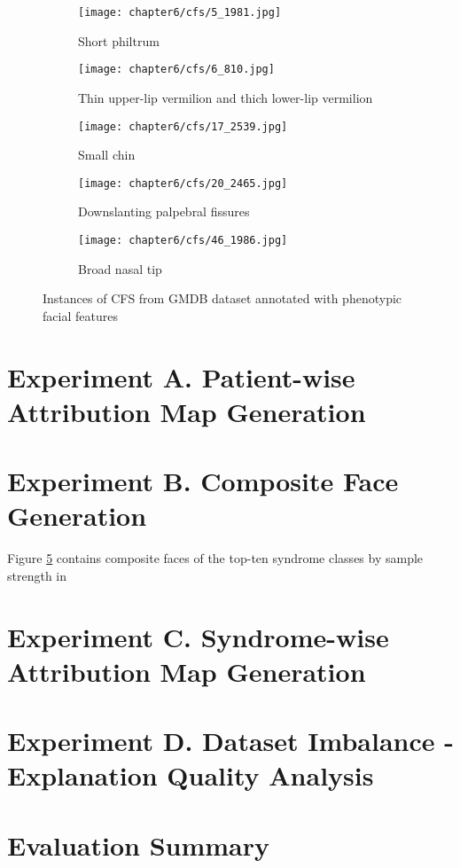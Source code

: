 \documentclass[../report.tex]{subfiles}
\begin{document}
	 \begin{figure}[H]\label{fig_cfs}
	 	\centering
	 	\begin{subfigure}[t]{0.17\textwidth}
	 		\centering
	 		\texttt{[image: chapter6/cfs/5\_1981.jpg]}
	 		\caption{Short philtrum}
	 	\end{subfigure}
	 	\begin{subfigure}[t]{0.17\textwidth}
	 		\centering
	 		\texttt{[image: chapter6/cfs/6\_810.jpg]}
	 		\caption{Thin upper-lip vermilion and thich lower-lip vermilion }
	 	\end{subfigure}	
	 	\begin{subfigure}[t]{0.17\textwidth}
	 		\centering
	 		\texttt{[image: chapter6/cfs/17\_2539.jpg]}
	 		\caption{Small chin}
	 	\end{subfigure}	
	 	\begin{subfigure}[t]{0.17\textwidth}
	 		\centering
	 		\texttt{[image: chapter6/cfs/20\_2465.jpg]}
	 		\caption{Downslanting palpebral fissures}
	 	\end{subfigure}	
	 	\begin{subfigure}[t]{0.17\textwidth}
	 		\centering
	 		\texttt{[image: chapter6/cfs/46\_1986.jpg]}
	 		\caption{Broad nasal tip}
	 	\end{subfigure}	
	 	\caption[Instances of HPMRS from GMDB dataset]{Instances of CFS from GMDB dataset annotated with phenotypic facial features}
	 \end{figure}
	 
	 
    \section{Experiment A. Patient-wise Attribution Map Generation}
    
    \section{Experiment B. Composite Face Generation}
    Figure \ref{} contains composite faces of the top-ten syndrome classes by sample strength in 
    
    
    
    
    
    
    
    
    \section{Experiment C. Syndrome-wise Attribution Map Generation}


	\section{Experiment D. Dataset Imbalance - Explanation Quality Analysis}

    \section{Evaluation Summary}
\end{document}
